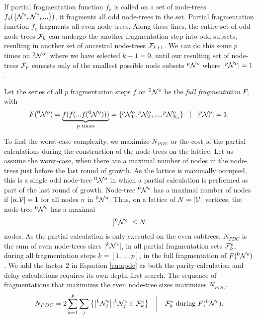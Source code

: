 If partial fragmentation function $f_o$ is called on a set of node-trees $f_o(\{\mathcal{N}^o, \mathcal{N}^e, ...\})$, it fragments all odd node-trees in the set. Partial fragmentation function $f_e$ fragments all even node-trees. Along these lines, the entire set of odd node-trees $\mathcal{F}_k$ can undergo the another fragmentation step into odd subsets, resulting in another set of ancestral node-trees $\mathcal{F}_{k+1}$. We can do this some $p$ times on ${}^{0}\mathcal{N}^o$, where we have selected $k-1=0$, until our resulting set of node-trees $\mathcal{F}_{p}$ consists only of the smallest possible node subsets ${}^{p}\mathcal{N}^o$ where $|{}^{p}\mathcal{N}^o|=1$. 

\begin{definition}\label{def:fullfrag}
  Let the series of all $p$ fragmentation steps $f$ on ${}^{0}\mathcal{N}^o$ be the \emph{full fragmentation} $F$, with
  \begin{equation}\label{eq:fullfrag}
    F({}^{0}\mathcal{N}^o) = \underbrace{f(f(...f({}^{0}\mathcal{N}^o)))}_\text{p times} = \{{}^{p}\mathcal{N}^{o}_1, {}^{p}\mathcal{N}^{o}_2,...,{}^{p}\mathcal{N}^{o}_{N_\sigma} \} \hspace{.3cm} | \hspace{.3cm} \abs{{}^{p}\mathcal{N}^{o}_i} = 1.
  \end{equation}
\end{definition}

To find the worst-case complexity, we maximize $N_{PDC}$ or the cost of the partial calculations during the construction of the node-trees on the lattice. Let us assume the worst-case, when there are a maximal number of nodes in the node-trees just before the last round of growth. As the lattice is maximally occupied, this is a single odd node-tree ${}^{0}\mathcal{N}^o$ in which a partial calculation is performed as part of the last round of growth. Node-tree ${}^{0}\mathcal{N}^o$ has a maximal number of nodes if $|n.\mathcal{V}|=1$ for all nodes $n$ in ${}^{0}\mathcal{N}^o$. Thus, on a lattice of $N=|\mathcal{V}|$ vertices, the node-tree ${}^{0}\mathcal{N}^o$ has a maximal 
\begin{equation}\label{eq:limitnsetsize}
  \abs{{}^{0}\mathcal{N}^o} \leq N
\end{equation}
nodes. As the partial calculation is only executed on the even subtrees, $N_{PDC}$ is the sum of even node-trees sizes $|{}^{k}\mathcal{N}^e|$, in all partial fragmentation sets $\mathcal{F}^o_{k}$, during all fragmentation steps $k=[1,...,p]$, in the full fragmentation of $F({}^{0}\mathcal{N}^o)$. We add the factor 2 in Equation \eqref{eq:npdc} as both the parity calculation and delay calculations requires its own depth-first search. The sequence of fragmentations that maximizes the even node-tree sizes maximizes $N_{PDC}$.
\begin{equation}\label{eq:npdc}
  N_{PDC} = 2\sum_{k=1}^{p}{ \sum_j{ \left\{ \abs{{}^{k}\mathcal{N}_j^e} \big| {}^{k}\mathcal{N}_j^e \in \mathcal{F}^o_k \right\} } }
  \hspace{1em} \bigg| \hspace{1em} \mathcal{F}_k^o \text{ during } F({}^{0}\mathcal{N}^o).
\end{equation}

